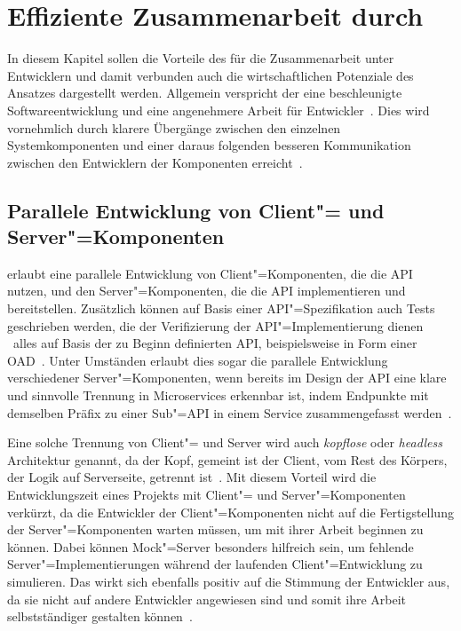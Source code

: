 \chapter{Effiziente Zusammenarbeit durch \AF}
In diesem Kapitel sollen die Vorteile des \AFAes für die Zusammenarbeit unter Entwicklern und damit verbunden auch die wirtschaftlichen Potenziale des Ansatzes dargestellt werden.
Allgemein verspricht der \AFA eine beschleunigte Softwareentwicklung und eine angenehmere Arbeit für Entwickler~\cite[354\psq]{de23}.
Dies wird vornehmlich durch klarere Übergänge zwischen den einzelnen Systemkomponenten und einer daraus folgenden besseren Kommunikation zwischen den Entwicklern der Komponenten erreicht~\cite[75]{bea22}.

\section{Parallele Entwicklung von Client"= und Server"=Komponenten} \label{sec:parallel-dev}
\AF erlaubt eine parallele Entwicklung von Client"=Komponenten, die die \ac{API} nutzen, und den Server"=Komponenten, die die \ac{API} implementieren und bereitstellen.
Zusätzlich können auf Basis einer \ac{API}"=Spezifikation auch Tests geschrieben werden, die der Verifizierung der \ac{API}"=Implementierung dienen \textendash\ alles auf Basis der zu Beginn definierten \ac{API}, beispielsweise in Form einer \ac{OAD}~\cite{vol22}.
Unter Umständen erlaubt dies sogar die parallele Entwicklung verschiedener Server"=Komponenten, wenn bereits im Design der \ac{API} eine klare und sinnvolle Trennung in Microservices erkennbar ist, indem \bspw Endpunkte mit demselben Präfix zu einer Sub"=\ac{API} in einem Service zusammengefasst werden~\cite[354]{de23}.

Eine solche Trennung von Client"= und Server wird auch \emph{kopflose} oder \emph{headless} Architektur genannt, da der Kopf, gemeint ist der Client, vom Rest des Körpers, der Logik auf Serverseite, getrennt ist~\cite[5]{kul23}.
Mit diesem Vorteil wird die Entwicklungszeit eines Projekts mit Client"= und Server"=Komponenten verkürzt, da die Entwickler der Client"=Komponenten nicht auf die Fertigstellung der Server"=Komponenten warten müssen, um mit ihrer Arbeit beginnen zu können.
Dabei können Mock"=Server besonders hilfreich sein, um fehlende Server"=Implementierungen während der laufenden Client"=Entwicklung zu simulieren.
Das wirkt sich ebenfalls positiv auf die Stimmung der Entwickler aus, da sie nicht auf andere Entwickler angewiesen sind und somit ihre Arbeit selbstständiger gestalten können~\cite[351]{de23}.

